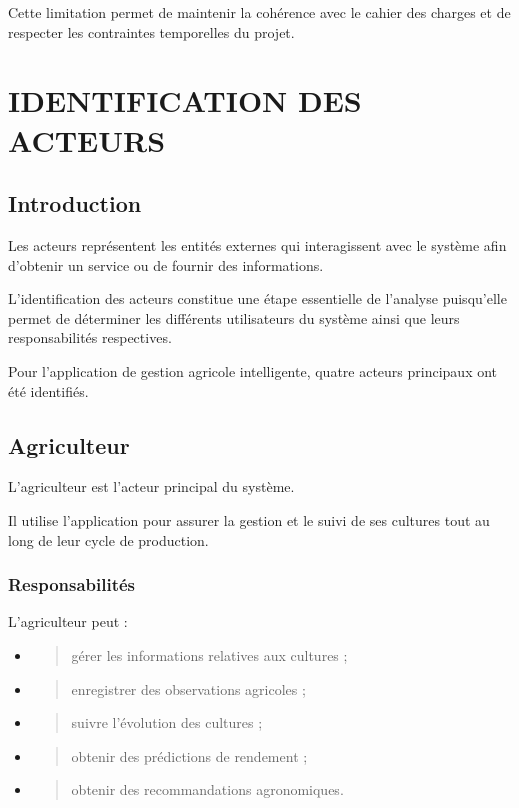 Cette limitation permet de maintenir la cohérence avec le cahier des
charges et de respecter les contraintes temporelles du projet.

\hypertarget{chapitre-3-identification-des-acteurs}{%
\chapter{IDENTIFICATION DES
ACTEURS}\label{chapitre-3-identification-des-acteurs}}

\hypertarget{introduction}{%
\section{Introduction}\label{introduction}}

Les acteurs représentent les entités externes qui interagissent avec le
système afin d'obtenir un service ou de fournir des informations.

L'identification des acteurs constitue une étape essentielle de
l'analyse puisqu'elle permet de déterminer les différents utilisateurs
du système ainsi que leurs responsabilités respectives.

Pour l'application de gestion agricole intelligente, quatre acteurs
principaux ont été identifiés.

\hypertarget{agriculteur}{%
\section{Agriculteur}\label{agriculteur}}

L'agriculteur est l'acteur principal du système.

Il utilise l'application pour assurer la gestion et le suivi de ses
cultures tout au long de leur cycle de production.

\hypertarget{responsabilituxe9s}{%
\subsection{Responsabilités}\label{responsabilituxe9s}}

L'agriculteur peut :

\begin{itemize}
\item
  \begin{quote}
  gérer les informations relatives aux cultures ;
  \end{quote}
\item
  \begin{quote}
  enregistrer des observations agricoles ;
  \end{quote}
\item
  \begin{quote}
  suivre l'évolution des cultures ;
  \end{quote}
\item
  \begin{quote}
  obtenir des prédictions de rendement ;
  \end{quote}
\item
  \begin{quote}
  obtenir des recommandations agronomiques.
  \end{quote}
\end{itemize}

